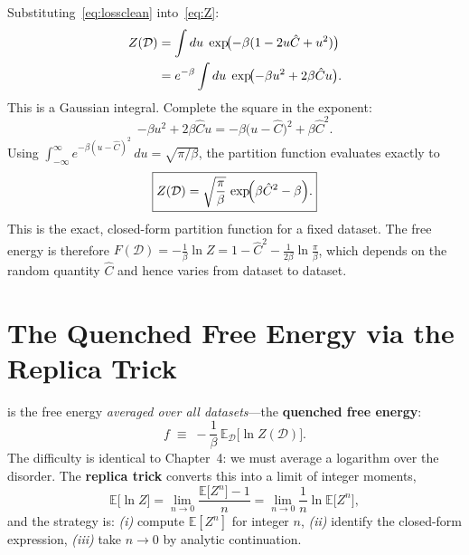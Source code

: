 \documentclass[nobib,justified]{tufte-handout}
\newcommand{\EE}{\mathbb{E}}
\newcommand{\cD}{\mathcal{D}}
\begin{document}
\noindent Substituting~\eqref{eq:lossclean} into~\eqref{eq:Z}:
\begin{align}
  Z(\cD)
  &= \int du\;\exp\!\bigl(-\beta(1-2u\hat{C}+u^2)\bigr) \notag\\
  &= e^{-\beta}\int du\;\exp\!\bigl(-\beta u^2 + 2\beta\hat{C}u\bigr).
  \label{eq:Zexpand}
\end{align}
This is a Gaussian integral.  Complete the square in the exponent:
\begin{equation}
  -\beta u^{2} + 2\beta\hat{C}u
  = -\beta\bigl(u-\hat{C}\bigr)^{2} + \beta\hat{C}^{2}.
  \label{eq:cs}
\end{equation}
Using $\int_{-\infty}^{\infty}e^{-\beta(u-\hat{C})^2}\,du =
\sqrt{\pi/\beta}$, the partition function evaluates exactly to
\begin{equation}
  \boxed{Z(\cD) = \sqrt{\frac{\pi}{\beta}}\,
    \exp\!\Bigl(\beta\hat{C}^{2}-\beta\Bigr).}
  \label{eq:Zexact}
\end{equation}
This is the exact, closed-form partition function for a fixed dataset.
The free energy is therefore $F(\cD) = -\frac{1}{\beta}\ln Z =
1 - \hat{C}^2 - \frac{1}{2\beta}\ln\frac{\pi}{\beta}$, which depends on
the random quantity $\hat{C}$ and hence varies from dataset to dataset.

\section{The Quenched Free Energy via the Replica Trick}

 is the free energy
\emph{averaged over all datasets}---the \textbf{quenched free energy}:
\begin{equation}
  f \;\equiv\; -\frac{1}{\beta}\,\EE_{\cD}\bigl[\ln Z(\cD)\bigr].
  \label{eq:qfe}
\end{equation}
The difficulty is identical to Chapter~4: we must average a logarithm
over the disorder.  The \textbf{replica trick} converts this into a
limit of integer moments,
\begin{equation}
  \EE\bigl[\ln Z\bigr]
  = \lim_{n\to 0}\frac{\EE\bigl[Z^{n}\bigr]-1}{n}
  = \lim_{n\to 0}\frac{1}{n}\ln\EE\bigl[Z^{n}\bigr],
  \label{eq:replicatrick}
\end{equation}
and the strategy is: \emph{(i)} compute $\EE[Z^n]$ for integer $n$,
\emph{(ii)} identify the closed-form expression, \emph{(iii)} take
$n\to 0$ by analytic continuation.
\end{document}
